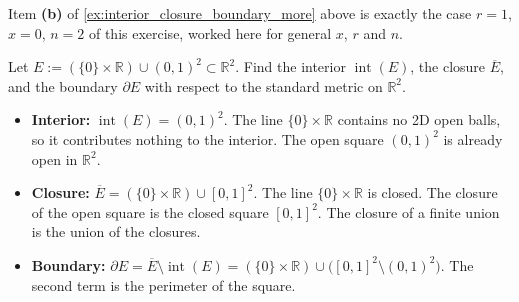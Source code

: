 \begin{remark}
Item \textbf{(b)} of \cref{ex:interior_closure_boundary_more} above is exactly the case $r=1$,
$x=0$, $n=2$ of this exercise, worked here for general $x$, $r$ and $n$.
\end{remark}

\begin{exercise}
\label{ex:interior_closure_boundary_mixed}
Let $E := (\{0\} \times \mathbb{R}) \cup (0,1)^2 \subset \mathbb{R}^2$. Find the interior $\operatorname{int}(E)$, the closure $\overline{E}$, and the boundary $\partial E$ with respect to the standard metric on $\mathbb{R}^2$.
\end{exercise}

\begin{exercisesolution}
\begin{itemize}
  \item \textbf{Interior:} $\operatorname{int}(E) = (0,1)^2$. The line $\{0\} \times \mathbb{R}$ contains no 2D open balls, so it contributes nothing to the interior. The open square $(0,1)^2$ is already open in $\mathbb{R}^2$.
  \item \textbf{Closure:} $\overline{E} = (\{0\} \times \mathbb{R}) \cup [0,1]^2$. The line $\{0\} \times \mathbb{R}$ is closed. The closure of the open square is the closed square $[0,1]^2$. The closure of a finite union is the union of the closures.
  \item \textbf{Boundary:} $\partial E = \overline{E} \setminus \operatorname{int}(E) = (\{0\} \times \mathbb{R}) \cup \big([0,1]^2 \setminus (0,1)^2\big)$. The second term is the perimeter of the square.
\end{itemize}
\end{exercisesolution}
